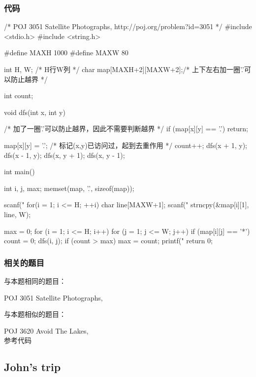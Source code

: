 \subsubsection{代码}
\begin{Codex}[label=satellite_photographs.c]
/* POJ 3051 Satellite Photographs, http://poj.org/problem?id=3051 */
#include <stdio.h>
#include <string.h>

#define MAXH 1000
#define MAXW 80

int H, W; /* H行W列 */
char map[MAXH+2][MAXW+2];/* 上下左右加一圈'.'可以防止越界 */

int count;

void dfs(int x, int y) {
    /* 加了一圈'.'可以防止越界，因此不需要判断越界 */
    if (map[x][y] == '.') return;

    map[x][y] = '.';  /* 标记(x,y)已访问过，起到去重作用 */
    count++;
    dfs(x + 1, y);
    dfs(x - 1, y);
    dfs(x, y + 1);
    dfs(x, y - 1);
}

int main() {
    int i, j, max;
    memset(map, '.', sizeof(map));

    scanf("%
    for(i = 1; i <= H; ++i) {
        char line[MAXW+1];
        scanf("%
        strncpy(&map[i][1], line, W);
    }

    max = 0;
    for (i = 1; i <= H; i++) {
        for (j = 1; j <= W; j++) {
            if (map[i][j] == '*') {
                count = 0;
                dfs(i, j);
            }
            if (count > max) max = count;
        }
    }
    printf("%
    return 0;
}
\end{Codex}


\subsubsection{相关的题目}
与本题相同的题目：
\begindot
\item POJ 3051 Satellite Photographs, 
\myenddot

与本题相似的题目：
\begindot
\item POJ 3620 Avoid The Lakes,  \\ 参考代码 
\myenddot


\subsection{John's trip}



